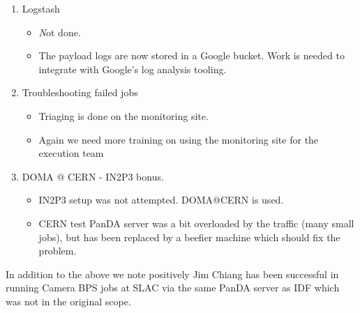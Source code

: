 \begin{enumerate}
\begin{itemize}
\end{itemize}
\item Logstash
\begin{itemize}
\item {\emph Not done. }
\item The payload logs are now stored in a Google bucket. Work is needed to integrate with Google's log analysis tooling.

\end{itemize}
\item Troubleshooting failed jobs
\begin{itemize}
\item Triaging is done on the monitoring site.
\item Again we need more training on using the monitoring site for the execution team
\end{itemize}
\item  DOMA @ CERN  - IN2P3 bonus.
\begin{itemize}
\item IN2P3 setup was not attempted.  DOMA@CERN is used.
\item CERN test PanDA server was a bit overloaded by the traffic (many small jobs), but has been replaced by a beefier machine which should fix the problem.
\end{itemize}
\end{enumerate}

In addition to the above we note positively Jim Chiang has been successful in running Camera BPS jobs at SLAC via the same PanDA server as IDF
which was not in the original scope.


